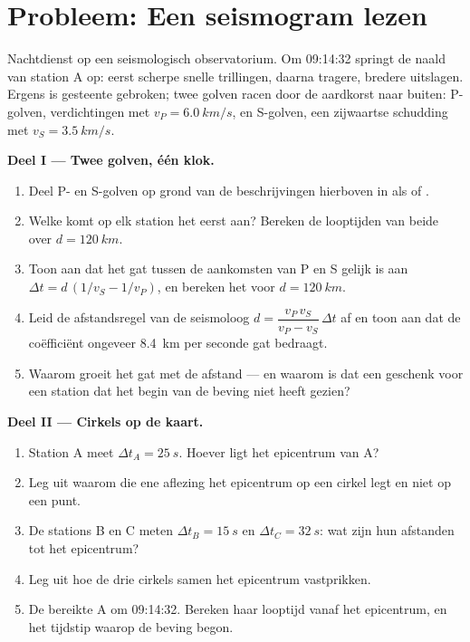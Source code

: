 \section{Probleem: Een seismogram lezen}

\begin{problem}
\label{pb:g12:mechanical-waves:1}
Nachtdienst op een seismologisch observatorium. Om 09:14:32 springt de
naald van station A op: eerst scherpe snelle trillingen, daarna tragere,
bredere uitslagen. Ergens is gesteente gebroken; twee golven racen door de
aardkorst naar buiten: P-golven, verdichtingen met
$v_P = \qty{6.0}{km/s}$, en S-golven, een zijwaartse schudding met
$v_S = \qty{3.5}{km/s}$.

\medskip
\noindent\textbf{Deel I --- Twee golven, één klok.}
\begin{enumerate}
  \item Deel P- en S-golven op grond van de beschrijvingen hierboven in
        als  of .
  \item Welke  komt op elk station het eerst aan? Bereken de
        looptijden van beide over $d = \qty{120}{km}$.
  \item Toon aan dat het gat tussen de aankomsten van P en S gelijk is
        aan $\Delta t = d\,(1/v_S - 1/v_P)$, en bereken het voor
        $d = \qty{120}{km}$.
  \item Leid de afstandsregel van de seismoloog
        $d = \dfrac{v_P\,v_S}{v_P - v_S}\,\Delta t$ af en toon aan dat de
        coëfficiënt ongeveer \qty{8.4}{km} per seconde gat bedraagt.
  \item Waarom groeit het gat met de afstand --- en waarom is dat een
        geschenk voor een station dat het begin van de beving niet heeft
        gezien?
\end{enumerate}

\medskip
\noindent\textbf{Deel II --- Cirkels op de kaart.}
\begin{enumerate}[resume]
  \item Station A meet $\Delta t_A = \qty{25}{s}$. Hoever ligt het
        epicentrum van A?
  \item Leg uit waarom die ene aflezing het epicentrum op een cirkel legt
        en niet op een punt.
  \item De stations B en C meten $\Delta t_B = \qty{15}{s}$ en
        $\Delta t_C = \qty{32}{s}$: wat zijn hun afstanden tot het
        epicentrum?
  \item Leg uit hoe de drie cirkels samen het epicentrum vastprikken.
  \item De  bereikte A om 09:14:32. Bereken haar looptijd vanaf het
        epicentrum, en het tijdstip waarop de beving begon.
\end{enumerate}


\end{problem}
